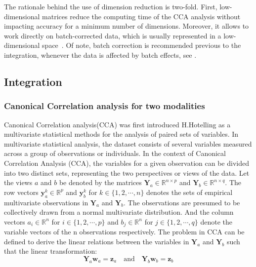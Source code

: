 The rationale behind the use of dimension reduction is two-fold. First, low-dimensional matrices reduce the computing time of the CCA analysis without impacting accuracy for a minimum number of dimensions. Moreover, it allows to work directly on batch-corrected data, which is usually represented in a low-dimensional space~\cite{hao2021seurat4, korsunsky2019harmony}. Of note, batch correction is recommended previous to the integration, whenever the data is affected by batch effects, see . 

\subsection{Integration}
\label{methods:integration:alg}
\subsubsection{Canonical Correlation analysis for two modalities}
Canonical Correlation analysis(CCA) was first introduced H.Hotelling\citep{hotelling1935cca1,HOTELLING1936cca2} as a multivariate statistical methods for the analysis of paired sets of variables. In multivariate statistical analysis, the dataset consists of several variables measured across a group of observations or individuals. In the context of Canonical Correlation Analysis (CCA), the variables for a given observation can be divided into two distinct sets, representing the two perspectives or views of the data. Let the views $a$ and $b$ be denoted by the matrices $\mathbf{Y}_a\in\mathbb{R}^{n\times p}$ and $\mathbf{Y}_b\in \mathbb{R}^{n\times q}$. The row vectors $\mathbf{y}_a^k\in \mathbb{R}^{p}$ and $\mathbf{y}_b^k$ for $k\in\{1,2,\cdots, n\}$ denotes the sets of empirical multivariate observations in $\mathbf{Y}_a$ and $\mathbf{Y}_b$. The observations are presumed to be collectively drawn from a normal multivariate distribution. And the column vectors $a_i\in \mathbb{R}^n$ for $i\in \{1,2,\cdots, p\}$ and $b_j\in \mathbb{R}^n$ for ${j\in \{1,2,\cdots, q\}}$ denote the variable vectors of the n observations respectively. The problem in CCA can be defined to derive the linear relations between the variables in $\mathbf{Y}_a$ and $\mathbf{Y}_b$ such that the linear transformation:
\begin{equation}
\mathbf{Y}_a\mathbf{w}_a=\mathbf{z}_a\quad\text{and}\quad \mathbf{Y}_b\mathbf{w}_b=\mathbf{ z}_b
\end{equation}

